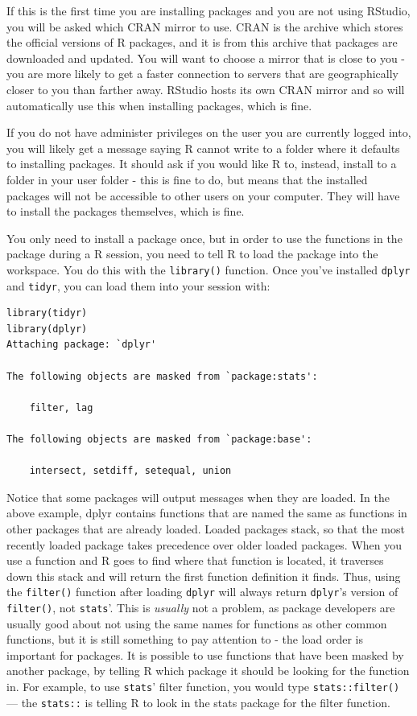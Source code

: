 \documentclass[12pt, oneside]{amsart}   	%
\begin{document}
If this is the first time you are installing packages and you are not using RStudio, you will be asked which CRAN mirror to use. CRAN is the archive which stores the official versions of R packages, and it is from this archive that packages are downloaded and updated. You will want to choose a mirror that is close to you - you are more likely to get a faster connection to servers that are geographically closer to you than farther away. RStudio hosts its own CRAN mirror and so will automatically use this when installing packages, which is fine. 

If you do not have administer privileges on the user you are currently logged into, you will likely get a message saying R cannot write to a folder where it defaults to installing packages. It should ask if you would like R to, instead, install to a folder in your user folder - this is fine to do, but means that the installed packages will not be accessible to other users on your computer. They will have to install the packages themselves, which is fine. 

You only need to install a package once, but in order to use the functions in the package during a R session, you need to tell R to load the package into the workspace. You do this with the \texttt{library()} function. Once you've installed \texttt{dplyr} and \texttt{tidyr}, you can load them into your session with:

\begin{verbatim}
library(tidyr)
library(dplyr)
Attaching package: `dplyr'

The following objects are masked from `package:stats':

    filter, lag

The following objects are masked from `package:base':

    intersect, setdiff, setequal, union
\end{verbatim}  

Notice that some packages will output messages when they are loaded. In the above example, dplyr contains functions that are named the same as functions in other packages that are already loaded. Loaded packages stack, so that the most recently loaded package takes precedence over older loaded packages. When you use a function and R goes to find where that function is located, it traverses down this stack and will return the first function definition it finds. Thus, using the \texttt{filter()} function after loading \texttt{dplyr} will always return \texttt{dplyr}'s version of \texttt{filter()}, not \texttt{stats}'. This is \textit{usually} not a problem, as package developers are usually good about not using the same names for functions as other common functions, but it is still something to pay attention to - the load order is important for packages. It is possible to use functions that have been masked by another package, by telling R which package it should be looking for the function in. For example, to use \texttt{stats}' filter function, you would type \texttt{stats::filter()} --- the \texttt{stats::} is telling R to look in the stats package for the filter function. 
\end{document}
